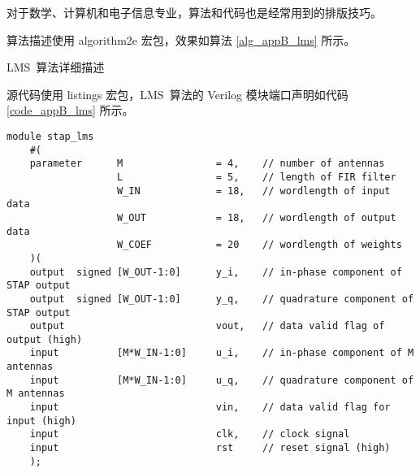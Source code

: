 

对于数学、计算机和电子信息专业，算法和代码也是经常用到的排版技巧。


算法描述使用 algorithm2e 宏包，效果如算法 \ref{alg_appB_lms} 所示。

\begin{algorithm}[ht]
	\caption{LMS~算法详细描述 \label{alg_appB_lms}}
	\IncMargin{2em}
	\DontPrintSemicolon
\end{algorithm}



源代码使用 listings 宏包，LMS~算法的 Verilog 模块端口声明如代码 \ref{code_appB_lms} 所示。

{\fontsize{10pt}{0.5\baselineskip}\selectfont
	\begin{lstlisting}[caption={空时~LMS~算法~Verilog~模块端口声明},label={code_appB_lms}]
	module stap_lms
	#(
	parameter      M                = 4,    // number of antennas
	               L                = 5,    // length of FIR filter
	               W_IN             = 18,   // wordlength of input data
	               W_OUT            = 18,   // wordlength of output data
	               W_COEF           = 20    // wordlength of weights
	)(
	output  signed [W_OUT-1:0]      y_i,    // in-phase component of STAP output
	output  signed [W_OUT-1:0]      y_q,    // quadrature component of STAP output
	output                          vout,   // data valid flag of output (high)
	input          [M*W_IN-1:0]     u_i,    // in-phase component of M antennas
	input          [M*W_IN-1:0]     u_q,    // quadrature component of M antennas
	input                           vin,    // data valid flag for input (high)
	input                           clk,    // clock signal
	input                           rst     // reset signal (high)
	);
	\end{lstlisting}
}

